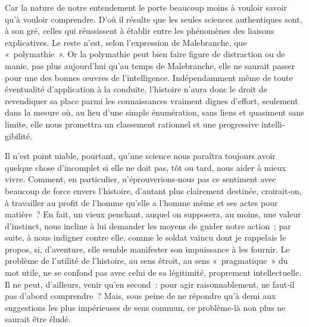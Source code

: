 \documentclass[french,twoside]{book} %
\newcommand{\astermono}{\medskip\centerline{\color{rubric}\large\selectfont{\syms ✻}}\medskip\par}%
\begin{document}
Car la nature de notre entendement le porte beaucoup moins à vouloir savoir qu’à vouloir comprendre. D’où il résulte que les seules sciences authentiques sont, à son gré, celles qui réussissent à établir entre les phénomènes des liaisons explicatives. Le reste n’est, selon l’expression de Malebranche, que « polymathie ». Or la polymathie peut bien faire figure de distraction ou de manie, pas plus aujourd’hui qu’au temps de Malebranche, elle ne saurait passer pour une des bonnes œuvres de l’intel­ligence. Indépendamment même de toute éventualité d’application à la conduite, l’histoire n’aura donc le droit de revendiquer sa place parmi  
\label{pXIII} les connaissances vraiment dignes d’effort, seulement dans la mesure où, au lieu d’une simple énumération, sans liens et quasiment sans limite, elle nous promettra un classement rationnel et une progressive intelli­gibilité.\par
Il n’est point niable, pourtant, qu’une science nous paraîtra toujours avoir quelque chose d’incomplet si elle ne doit pas, tôt ou tard, nous aider à mieux vivre. Comment, en particulier, n’éprouverions‑nous pas ce sentiment avec beaucoup de force envers l’histoire, d’autant plus clairement destinée, croirait‑on, à travailler au profit de l’homme qu’elle a l’homme même et ses actes pour matière ? En fait, un vieux penchant, auquel on supposera, au moins, une valeur d’instinct, nous incline à lui demander les moyens de guider notre action ; par suite, à nous indigner contre elle, comme le soldat vaincu dont je rappelais le propos, si, d’aven­ture, elle semble manifester son impuissance à les fournir. Le problème de l’utilité de l’histoire, au sens étroit, au sens « pragmatique » du mot utile, ne se confond pas avec celui de sa légitimité, proprement intel­lectuelle. Il ne peut, d’ailleurs, venir qu’en second : pour agir raison­nablement, ne faut‑il pas d’abord comprendre ? Mais, sous peine de ne répondre qu’à demi aux suggestions les plus impérieuses de sens commun, ce problème‑là non plus ne saurait être éludé.\par

\astermono
\end{document}
